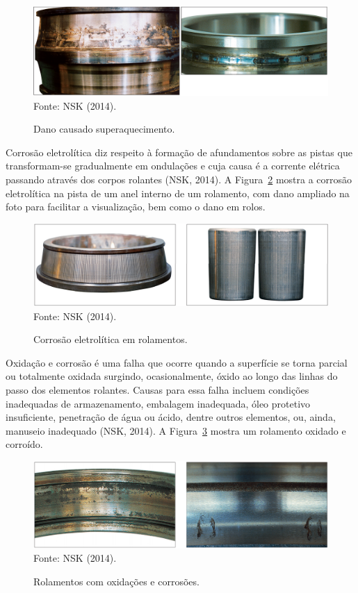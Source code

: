\documentclass[
	12pt,				
	oneside,			
	a4paper,			
	english,			
	brazil,			
	]{abntex2ppgsi}
\begin{document}
\begin{figure}[H]
\centering
\caption {Dano causado superaquecimento.}
\includegraphics[width=\textwidth,height=\textheight,keepaspectratio]{superaquecimento_nsk} \\
Fonte: NSK (2014).
\label{superaquecimento_nsk}
\end{figure}

Corrosão eletrolítica diz respeito à formação de afundamentos sobre as pistas que transformam-se gradualmente em ondulações e cuja causa é a corrente elétrica passando através dos corpos rolantes (NSK, 2014). A Figura~\ref{corrosao_eletrolitica_nsk} mostra a corrosão eletrolítica na pista de um anel interno de um rolamento, com dano ampliado na foto para facilitar a visualização, bem como o dano em rolos. 

\begin{figure}[H]
\centering
\caption {Corrosão eletrolítica em rolamentos.}
\includegraphics[width=\textwidth,height=\textheight,keepaspectratio]{corrosao_eletrolitica_nsk} \\
Fonte: NSK (2014).
\label{corrosao_eletrolitica_nsk}
\end{figure}

Oxidação e corrosão é uma falha que ocorre quando a superfície se torna parcial ou totalmente oxidada surgindo, ocasionalmente, óxido ao longo das linhas do passo dos elementos rolantes. Causas para essa falha incluem condições inadequadas de armazenamento, embalagem inadequada, óleo protetivo insuficiente, penetração de água ou ácido, dentre outros elementos, ou, ainda, manuseio inadequado (NSK, 2014). A Figura~\ref{oxidacao_nsk} mostra um rolamento oxidado e corroído.

\begin{figure}[H]
\centering
\caption {Rolamentos com oxidações e corrosões.}
\includegraphics[width=\textwidth,height=\textheight,keepaspectratio]{oxidacao_nsk} \\
Fonte: NSK (2014).
\label{oxidacao_nsk}
\end{figure}
\end{document}
